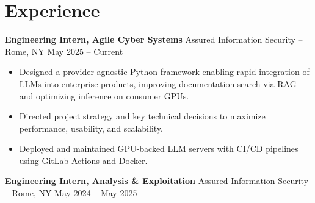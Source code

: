 \section*{Experience}
\textbf{Engineering Intern, Agile Cyber Systems} {Assured Information Security} -- Rome, NY \hfill May 2025 -- Current \\
\vspace{-8pt}
\begin{itemize}
	\item Designed a provider-agnostic Python framework enabling rapid integration of LLMs into enterprise products, improving documentation search via RAG and optimizing inference on consumer GPUs.
	\item Directed project strategy and key technical decisions to maximize performance, usability, and scalability.
	\item Deployed and maintained GPU-backed LLM servers with CI/CD pipelines using GitLab Actions and Docker.	
\end{itemize}
\vspace{-8pt}
\textbf{Engineering Intern, Analysis \& Exploitation} {Assured Information Security} -- Rome, NY \hfill May 2024 -- May 2025 \\
\vspace{-8pt}
